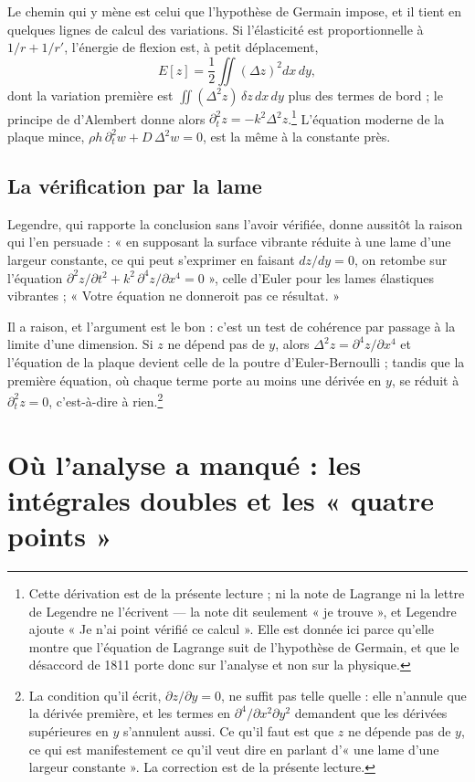 \documentclass[11pt,a4paper]{article}
\begin{document}
Le chemin qui y mène est celui que l'hypothèse de Germain impose, et il tient
en quelques lignes de calcul des variations. Si l'élasticité est
proportionnelle à
$1/r+1/r'$, l'énergie de flexion est, à petit déplacement,
\[
  E[z] = \frac{1}{2}\iint \left(\Delta z\right)^2 dx\,dy,
\]
dont la variation première est $\iint (\Delta^2 z)\,\delta z\,dx\,dy$ plus des
termes de bord ; le principe de d'Alembert donne alors
$\partial_t^2 z = -k^2\Delta^2 z$.\footnote{Cette dérivation est de la présente
lecture ; ni la note de Lagrange ni la lettre de Legendre ne l'écrivent — la
note dit seulement « je trouve », et Legendre ajoute « Je n'ai point vérifié ce
calcul ». Elle est donnée ici parce qu'elle montre que l'équation de Lagrange
suit de l'hypothèse de Germain, et que le désaccord de 1811 porte donc sur
l'analyse et non sur la physique.} L'équation moderne de la plaque mince,
$\rho h\,\partial_t^2 w + D\,\Delta^2 w = 0$, est la même à la constante près.

\subsection*{La vérification par la lame}

Legendre, qui rapporte la conclusion sans l'avoir vérifiée, donne aussitôt la
raison qui l'en persuade : « en supposant la surface vibrante réduite à une
lame d'une largeur constante, ce qui peut s'exprimer en faisant $dz/dy = 0$,
on retombe sur l'équation
$\partial^2 z/\partial t^2 + k^2\,\partial^4 z/\partial x^4 = 0$ », celle
d'Euler pour les lames élastiques vibrantes ; « Votre équation ne donneroit pas
ce résultat. »

Il a raison, et l'argument est le bon : c'est un test de cohérence par passage
à la limite d'une dimension. Si $z$ ne dépend pas de $y$, alors
$\Delta^2 z = \partial^4 z/\partial x^4$ et l'équation de la plaque devient
celle de la poutre d'Euler-Bernoulli ; tandis que la première équation, où
chaque terme porte au moins une dérivée en $y$, se réduit à
$\partial_t^2 z = 0$, c'est-à-dire à rien.\footnote{La condition qu'il écrit,
$\partial z/\partial y = 0$, ne suffit pas telle quelle : elle n'annule que la
dérivée première, et les termes en $\partial^4/\partial x^2\partial y^2$
demandent que les dérivées supérieures en $y$ s'annulent aussi. Ce qu'il faut
est que $z$ ne dépende pas de $y$, ce qui est manifestement ce qu'il veut dire
en parlant d'« une lame d'une largeur constante ». La correction est de la
présente lecture.}

\section*{Où l'analyse a manqué : les intégrales doubles et les « quatre points »}
\end{document}
